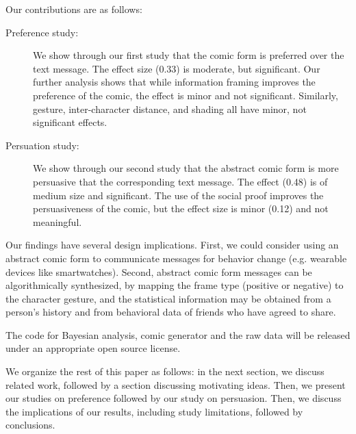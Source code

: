 Our contributions are as follows:
\begin{description}
  \item[Preference study:] We show through our first study that the comic form is preferred over the text message. The effect size (0.33) is moderate, but significant. Our further analysis shows that while information framing improves the preference of the comic, the effect is minor and not significant. Similarly, gesture, inter-character distance, and shading all have minor, not significant effects.
  \item[Persuation study:] We show through our second study that the abstract comic form is more persuasive that the corresponding text message. The effect (0.48) is of medium size and significant. The use of the social proof improves the persuasiveness of the comic, but the effect size is minor (0.12) and not meaningful.
\end{description}

Our findings have several design implications. First, we could consider using an abstract comic form to communicate messages for behavior change (e.g. wearable devices like smartwatches). Second, abstract comic form messages can be algorithmically synthesized, by mapping the frame type (positive or negative) to the character gesture, and the statistical information may be obtained from a person's history and from behavioral data of friends who have agreed to share.

The code for Bayesian analysis, comic generator and the raw data will be released under an appropriate open source license.




We organize the rest of this paper as follows: in the next section, we discuss related work, followed by a section discussing motivating ideas. Then, we present our studies on preference followed by our study on persuasion. Then, we discuss the implications of our results, including study limitations, followed by conclusions.
